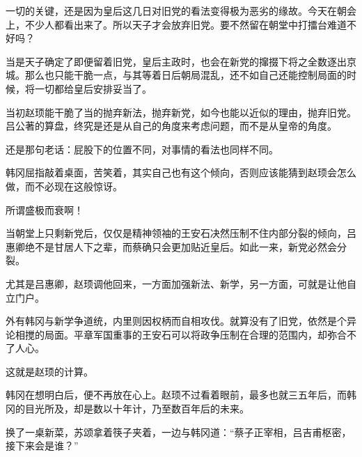 一切的关键，还是因为皇后这几日对旧党的看法变得极为恶劣的缘故。今天在朝会上，不少人都看出来了。所以天子才会放弃旧党。要不然留在朝堂中打擂台难道不好吗？

当是天子确定了即便留着旧党，皇后主政时，也会在新党的撺掇下将之全数逐出京城。那么也只能干脆一点，与其等着日后朝局混乱，还不如自己还能控制局面的时候，将一切都给皇后安排妥当了。

当初赵顼能干脆了当的抛弃新法，抛弃新党，如今也能以近似的理由，抛弃旧党。吕公著的算盘，终究是还是从自己的角度来考虑问题，而不是从皇帝的角度。

还是那句老话：屁股下的位置不同，对事情的看法也同样不同。

韩冈屈指敲着桌面，苦笑着，其实自己也有这个倾向，否则应该能猜到赵顼会怎么做，而不必现在这般惊讶。

所谓盛极而衰啊！

当朝堂上只剩新党后，仅仅是精神领袖的王安石决然压制不住内部分裂的倾向，吕惠卿绝不是甘居人下之辈，而蔡确只会更加贴近皇后。如此一来，新党必然会分裂。

尤其是吕惠卿，赵顼调他回来，一方面加强新法、新学，另一方面，可就是让他自立门户。

外有韩冈与新学争道统，内里则因权柄而自相攻伐。就算没有了旧党，依然是个异论相搅的局面。平章军国重事的王安石可以将政争压制在合理的范围内，却弥合不了人心。

这就是赵顼的计算。

韩冈在想明白后，便不再放在心上。赵顼不过看着眼前，最多也就三五年后，而韩冈的目光所及，却是数以十年计，乃至数百年后的未来。

换了一桌新菜，苏颂拿着筷子夹着，一边与韩冈道：“蔡子正宰相，吕吉甫枢密，接下来会是谁？”

